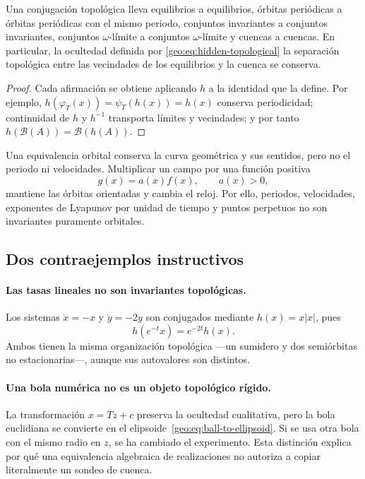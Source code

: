 \begin{proposition}
Una conjugación topológica lleva equilibrios a equilibrios, órbitas periódicas
a órbitas periódicas con el mismo periodo, conjuntos invariantes a conjuntos
invariantes, conjuntos \(\omega\)-límite a conjuntos \(\omega\)-límite y
cuencas a cuencas. En particular,
\ifHAFOBasinMaterial
la ocultedad definida por \eqref{geo:eq:hidden-topological}
\else
la separación topológica entre las vecindades de los equilibrios y la cuenca
\fi
se conserva.
\end{proposition}

\begin{proof}
Cada afirmación se obtiene aplicando \(h\) a la identidad que la define. Por
ejemplo,
\(h(\varphi_T(x))=\psi_T(h(x))=h(x)\) conserva periodicidad; continuidad de
\(h\) y \(h^{-1}\) transporta límites y vecindades; y por tanto
\(h(\mathcal B(A))=\mathcal B(h(A))\).
\end{proof}

Una equivalencia orbital conserva la curva geométrica y sus sentidos, pero no
el periodo ni velocidades. Multiplicar un campo por una función positiva
\begin{equation}
 g(x)=a(x)f(x),\qquad a(x)>0,
 \label{geo:eq:positive-time-rescaling}
\end{equation}
mantiene las órbitas orientadas y cambia el reloj. Por ello, periodos,
velocidades, exponentes de Lyapunov por unidad de tiempo y puntos perpetuos no
son invariantes puramente orbitales.

\subsection{Dos contraejemplos instructivos}

\paragraph{Las tasas lineales no son invariantes topológicas.}
Los sistemas \(\dot x=-x\) y \(\dot y=-2y\) son conjugados mediante
\(h(x)=x|x|\), pues
\[
 h(e^{-t}x)=e^{-2t}h(x).
\]
Ambos tienen la misma organización topológica ---un sumidero y dos
semiórbitas no estacionarias---, aunque sus autovalores son distintos.

\paragraph{Una bola numérica no es un objeto topológico rígido.}
La transformación \(x=Tz+c\) preserva la ocultedad cualitativa, pero la bola
euclidiana se convierte en el elipsoide~\eqref{geo:eq:ball-to-ellipsoid}. Si se
usa otra bola con el mismo radio en \(z\), se ha cambiado el experimento. Esta
distinción explica por qué una equivalencia algebraica de realizaciones no
autoriza a copiar literalmente un sondeo de cuenca.

